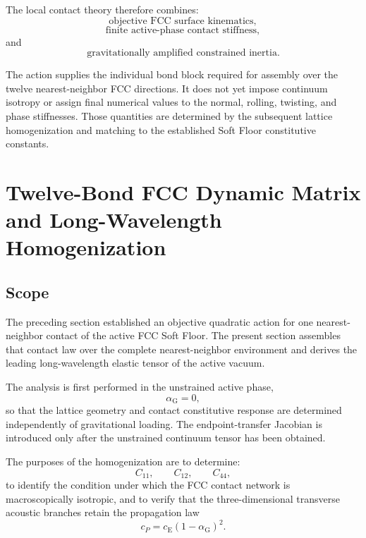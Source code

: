 The local contact theory therefore combines:
\begin{equation}
    \text{objective FCC surface kinematics},
\end{equation}
\begin{equation}
    \text{finite active-phase contact stiffness},
\end{equation}
and
\begin{equation}
    \text{gravitationally amplified constrained inertia}.
\end{equation}

The action supplies the individual bond block required for assembly over the twelve nearest-neighbor FCC directions. It does not yet impose continuum isotropy or assign final numerical values to the normal, rolling, twisting, and phase stiffnesses. Those quantities are determined by the subsequent lattice homogenization and matching to the established Soft Floor constitutive constants.

\section{Twelve-Bond FCC Dynamic Matrix and Long-Wavelength Homogenization}

\subsection{Scope}

The preceding section established an objective quadratic action for one nearest-neighbor contact of the active FCC Soft Floor. The present section assembles that contact law over the complete nearest-neighbor environment and derives the leading long-wavelength elastic tensor of the active vacuum.

The analysis is first performed in the unstrained active phase,
\begin{equation}
    \alpha_{\mathrm{G}} = 0,
\end{equation}
so that the lattice geometry and contact constitutive response are determined independently of gravitational loading. The endpoint-transfer Jacobian is introduced only after the unstrained continuum tensor has been obtained.

The purposes of the homogenization are to determine:
\begin{equation}
    C_{11}, \qquad C_{12}, \qquad C_{44},
\end{equation}
to identify the condition under which the FCC contact network is macroscopically isotropic, and to verify that the three-dimensional transverse acoustic branches retain the propagation law
\begin{equation}
    c_P = c_{\mathrm{E}} \left( 1-\alpha_{\mathrm{G}} \right)^2.
\end{equation}

